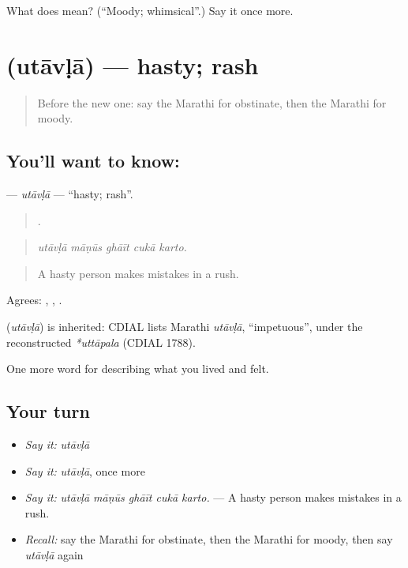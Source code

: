 \begin{tcolorbox}[breakable,colback=teal!4,colframe=teal!35!black,title={Before you move on}]
What does  mean? (\textquotedblleft{}Moody; whimsical\textquotedblright{}.) Say it once more.
\end{tcolorbox}
\section[\texorpdfstring{\mr{उतावळा} (utāvḷā)}{उतावळा (utāvḷā)}]{ (utāvḷā) — hasty; rash}

\label{lesson:MR-C472-utavla}



\begin{quote}
Before the new one: say the Marathi for obstinate, then the Marathi for moody.
\end{quote}

\subsection*{You'll want to know: }
\textbf{} — \emph{utāvḷā} — \textquotedblleft{}hasty; rash\textquotedblright{}.

\begin{quote}
    .
\end{quote}

\begin{quote}
\emph{utāvḷā māṇūs ghāīt cukā karto.}
\end{quote}

\begin{quote}
A hasty person makes mistakes in a rush.
\end{quote}

Agrees: , , .

\begin{cousinweb}
\textbf{} (\emph{utāvḷā}) is inherited: CDIAL lists Marathi \emph{utāvḷā}, \textquotedblleft{}impetuous\textquotedblright{}, under the reconstructed \emph{*uttāpala} (CDIAL 1788).
\end{cousinweb}

\begin{grammarlens}[title={What you've built}]
One more word for describing what you lived and felt.
\end{grammarlens}

\subsection*{Your turn}
\begin{itemize}
\raggedright
  \item \emph{Say it:} \emph{utāvḷā}
  \item \emph{Say it:} \emph{utāvḷā}, once more
  \item \emph{Say it:} \emph{utāvḷā māṇūs ghāīt cukā karto.} — A hasty person makes mistakes in a rush.
  \item \emph{Recall:} say the Marathi for obstinate, then the Marathi for moody, then say \emph{utāvḷā} again
\end{itemize}

